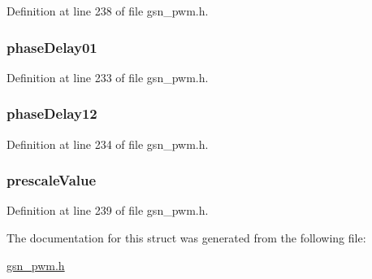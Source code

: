 Definition at line 238 of file gsn\_\-pwm.h.

\hypertarget{a00181_a8de18931724a643f1df1baf94b681872}{
\subsubsection[{phaseDelay01}]{ {\bf phaseDelay01}}}
\label{a00181_a8de18931724a643f1df1baf94b681872}


Definition at line 233 of file gsn\_\-pwm.h.

\hypertarget{a00181_ad6d3212158daea01137f525cd6890ad2}{
\subsubsection[{phaseDelay12}]{ {\bf phaseDelay12}}}
\label{a00181_ad6d3212158daea01137f525cd6890ad2}


Definition at line 234 of file gsn\_\-pwm.h.

\hypertarget{a00181_af00c7cbcd38a18bbcac043542f5383dd}{
\subsubsection[{prescaleValue}]{ {\bf prescaleValue}}}
\label{a00181_af00c7cbcd38a18bbcac043542f5383dd}


Definition at line 239 of file gsn\_\-pwm.h.



The documentation for this struct was generated from the following file:\begin{DoxyCompactItemize}
\item 
\hyperlink{a00540}{gsn\_\-pwm.h}\end{DoxyCompactItemize}
